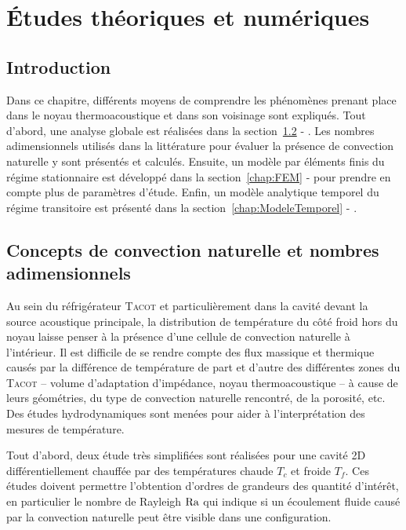 \chapter{\'Etudes théoriques et numériques}\label{chap:SimusRealisees}
\mylocaltoc

\section{Introduction}
Dans ce chapitre, différents moyens de comprendre les phénomènes prenant place dans le noyau thermoacoustique et dans son voisinage sont expliqués. Tout d'abord, une analyse globale est réalisées dans la section~\ref{chap:NbrAdim} - . Les nombres adimensionnels utilisés dans la littérature pour évaluer la présence de convection naturelle y sont présentés et calculés. Ensuite, un modèle par éléments finis du régime stationnaire est développé dans la section~\ref{chap:FEM} -  pour prendre en compte plus de paramètres d'étude. Enfin, un modèle analytique temporel du régime transitoire est présenté dans la section~\ref{chap:ModeleTemporel} - .

\section{Concepts de convection naturelle et nombres adimensionnels}\label{chap:NbrAdim}
Au sein du réfrigérateur \textsc{Tacot} et particulièrement dans la cavité devant la source acoustique principale, la distribution de température du côté froid hors du noyau laisse penser à la présence d'une cellule de convection naturelle à l'intérieur. Il est difficile de se rendre compte des flux massique et thermique causés par la différence de température de part et d'autre des différentes zones du \textsc{Tacot} -- volume d'adaptation d'impédance, noyau thermoacoustique -- à cause de leurs géométries, du type de convection naturelle rencontré, de la porosité, etc. Des études hydrodynamiques sont menées pour aider à l'interprétation des mesures de température. \medskip

Tout d'abord, deux étude très simplifiées sont réalisées pour une cavité 2D différentiellement chauffée par des températures chaude $T_c$ et froide $T_f$. Ces études doivent permettre l'obtention d'ordres de grandeurs des quantité d'intérêt, en particulier le nombre de Rayleigh $\mathrm{Ra}$ qui indique si un écoulement fluide causé par la convection naturelle peut être visible dans une configuration. \smallskip

